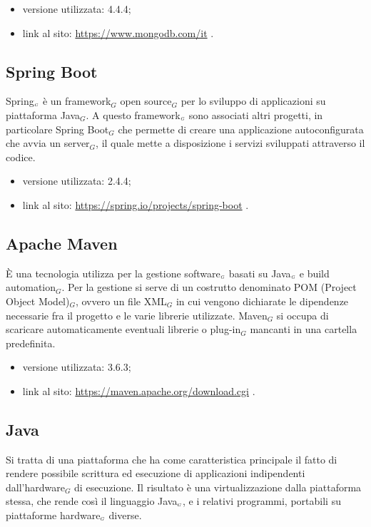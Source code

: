 \begin{itemize}
    \item versione utilizzata: 4.4.4;
    \item link al sito: \url{https://www.mongodb.com/it} .
\end{itemize}

\subsection{Spring Boot} \label{TecnologieSpring}
Spring$_{\scaleto{G}{3pt}}$ è un framework$_G$ open source$_G$ per lo sviluppo di applicazioni su piattaforma Java$_G$. A  questo framework$_{\scaleto{G}{3pt}}$ sono associati altri progetti, in particolare Spring Boot$_G$ che permette di creare una applicazione autoconfigurata che avvia un server$_G$, il quale mette a disposizione i servizi sviluppati attraverso il codice.
\begin{itemize}
	\item versione utilizzata: 2.4.4;
	\item link al sito: \url{https://spring.io/projects/spring-boot} .
\end{itemize}

\subsection{Apache Maven}\label{TecnologieMaven}
È una tecnologia utilizza per la gestione software$_{\scaleto{G}{3pt}}$ basati su Java$_{\scaleto{G}{3pt}}$ e build automation$_G$.
Per la gestione si serve di un costrutto denominato POM (Project Object Model)$_G$, ovvero un file XML$_G$ in cui vengono dichiarate le dipendenze necessarie fra il progetto e le varie librerie utilizzate.
Maven$_G$ si occupa di scaricare automaticamente eventuali librerie o plug-in$_G$ mancanti in una cartella predefinita.

\begin{itemize}
	\item versione utilizzata: 3.6.3;
	\item link al sito: \url{https://maven.apache.org/download.cgi} .
\end{itemize}

\subsection{Java}\label{TecnologieJava}
Si tratta di una piattaforma che ha come caratteristica principale il fatto di rendere possibile scrittura ed esecuzione di applicazioni indipendenti dall'hardware$_G$ di esecuzione.
Il risultato è una virtualizzazione dalla piattaforma stessa, che rende così il linguaggio Java$_{\scaleto{G}{3pt}}$, e i relativi programmi, portabili su piattaforme hardware$_{\scaleto{G}{3pt}}$ diverse.

